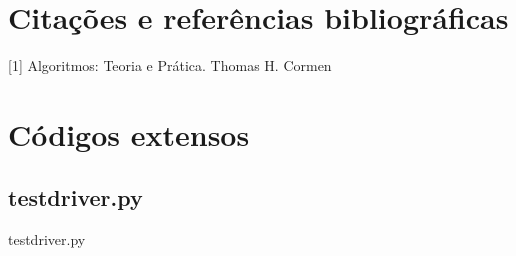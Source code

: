 \documentclass[12pt,a4paper,twoside]{report}
\begin{document}
\chapter{Citações e referências bibliográficas}
	[1] Algoritmos: Teoria e Prática. Thomas H. Cormen
			\date{Today}







\clearpage
{}
\appendix

\chapter{Códigos extensos \label{ap:testdriver}}
\section{testdriver.py}
 {testdriver.py}
\end{document}
